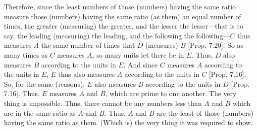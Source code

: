\begin{Parallel}{}{}
{\epsfysize=1.8in
\centerline{}

Therefore, since the least numbers of those (numbers) having the
same ratio measure those (numbers) having the same ratio (as them)
an equal number of times, the greater (measuring) the greater, and
the lesser  the lesser---that is to say, the leading (measuring) the leading, and
the following the following---$C$ thus measures $A$ the same number of
times that $D$ (measures) $B$  [Prop. 7.20].
So as many times as $C$ measures $A$, so many units let there be in $E$.
Thus, $D$ also measures $B$ according to the units in $E$. And since $C$ measures
$A$ according to the units in $E$, $E$ thus also measures $A$ according to the
units in $C$ [Prop. 7.16]. So, for the
same (reasons), $E$ also measures $B$ according to the units in $D$  [Prop. 7.16]. Thus, $E$ measures $A$ and $B$, which
are prime to one another. The very thing is impossible. Thus, there cannot
be any numbers less than $A$ and $B$ which are in the same ratio as $A$ and
$B$. Thus, $A$ and $B$ are the least of those (numbers) having the same ratio
as them. (Which is) the very thing it was required to show.}
\end{Parallel}

